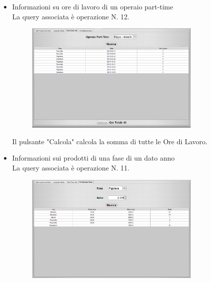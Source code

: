 \documentclass{article}
\begin{document}
\begin{itemize}
\newpage
\item Informazioni su ore di lavoro di un operaio part-time\\
La query associata è operazione N. 12.\\
\begin{figure}[htbp]
\centering
\includegraphics[width=0.8\textwidth]{img/panel_part_ore.png}
\end{figure}\newline
Il pulsante "Calcola" calcola la somma di tutte le Ore di Lavoro.\\
\item Informazioni sui prodotti di una fase di un dato anno \\
La query associata è operazione N. 11.\\
\begin{figure}[htbp]
\centering
\includegraphics[width=0.8\textwidth]{img/panel_info_prodotti.png}
\end{figure}
\end{itemize}
\end{document}

